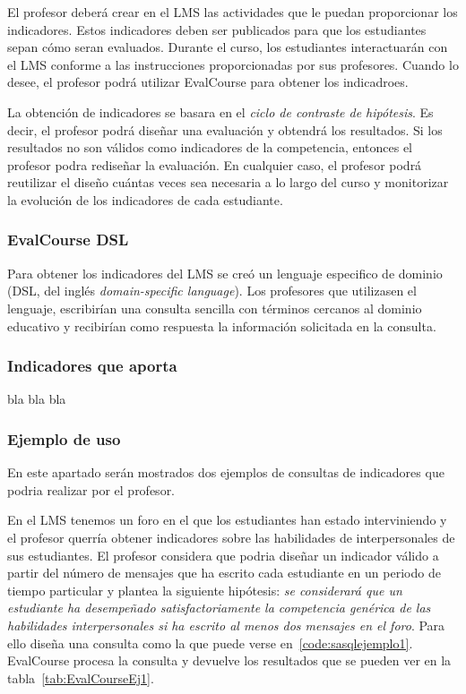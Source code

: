 El profesor deberá crear en el LMS las actividades que le puedan proporcionar los indicadores. Estos indicadores deben ser publicados para que los estudiantes sepan cómo seran evaluados. Durante el curso, los estudiantes interactuarán con el LMS conforme a las instrucciones proporcionadas por sus profesores. Cuando lo desee, el profesor podrá utilizar EvalCourse para obtener los indicadroes.

La obtención de indicadores se basara en el \emph{ciclo de contraste de hipótesis}. Es decir, el profesor podrá diseñar una evaluación y obtendrá los resultados. Si los resultados no son válidos como indicadores de la competencia, entonces el profesor podra rediseñar la evaluación. En cualquier caso, el profesor podrá reutilizar el diseño cuántas veces sea necesaria a lo largo del curso y monitorizar la evolución de los indicadores de cada estudiante.

\subsubsection{EvalCourse DSL}

Para obtener los indicadores del LMS se creó un lenguaje especifico de dominio (DSL, del inglés \emph{domain-specific language}). Los profesores que utilizasen el lenguaje, escribirían una consulta sencilla con términos cercanos al dominio educativo y recibirían como respuesta la información solicitada en la consulta. 

\subsubsection{Indicadores que aporta}

bla bla bla

\subsubsection{Ejemplo de uso}

En este apartado serán mostrados dos ejemplos de consultas de indicadores que podria realizar por el profesor.

En el LMS tenemos un foro en el que los estudiantes han estado interviniendo y el profesor querría obtener indicadores sobre las habilidades de interpersonales de sus estudiantes. El profesor considera que podria diseñar un indicador válido a partir del número de mensajes que ha escrito cada estudiante en un periodo de tiempo particular y plantea la siguiente hipótesis: \emph{se considerará que un estudiante ha desempeñado satisfactoriamente la competencia genérica de las habilidades interpersonales si ha escrito al menos dos mensajes en el foro}. Para ello diseña una consulta como la que puede verse en~\ref{code:sasqlejemplo1}. EvalCourse procesa la consulta y devuelve los resultados que se pueden ver en la tabla~\ref{tab:EvalCourseEj1}.

